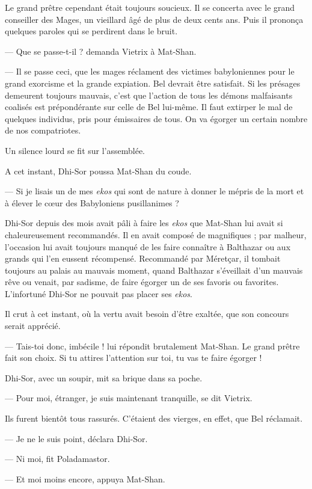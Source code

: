 \documentclass[a4paper, 11pt, oneside, polutonikogreek, french]{article}
\begin{document}
Le grand prêtre cependant était toujours soucieux. Il se concerta avec le grand conseiller des Mages, un vieillard âgé de plus de deux cents ans. Puis il prononça quelques paroles qui se perdirent dans le bruit.

--- Que se passe-t-il ? demanda Vietrix à Mat-Shan.

--- Il se passe ceci, que les mages réclament des victimes babyloniennes pour le grand exorcisme et la grande expiation. Bel devrait être satisfait. Si les présages demeurent toujours mauvais, c'est que l'action de tous les démons malfaisants coalisés est prépondérante sur celle de Bel lui-même. Il faut extirper le mal de quelques individus, pris pour émissaires de tous. On va égorger un certain nombre de nos compatriotes.

Un silence lourd se fit sur l'assemblée.

A cet instant, Dhi-Sor poussa Mat-Shan du coude.

--- Si je lisais un de mes \emph{ekos} qui sont de nature à donner le mépris de la mort et à élever le cœur des Babyloniens pusillanimes ?

Dhi-Sor depuis des mois avait pâli à faire les \emph{ekos} que Mat-Shan lui avait si chaleureusement recommandés. Il en avait composé de magnifiques ; par malheur, l'occasion lui avait toujours manqué de les faire connaître à Balthazar ou aux grands qui l'en eussent récompensé. Recommandé par Méretçar, il tombait toujours au palais au mauvais moment, quand Balthazar s'éveillait d'un mauvais rêve ou venait, par sadisme, de faire égorger un de ses favoris ou favorites. L'infortuné Dhi-Sor ne pouvait pas placer ses \emph{ekos}.

Il crut à cet instant, où la vertu avait besoin d'être exaltée, que son concours serait apprécié.

--- Tais-toi donc, imbécile ! lui répondit brutalement Mat-Shan. Le grand prêtre fait son choix. Si tu attires l'attention sur toi, tu vas te faire égorger !

Dhi-Sor, avec un soupir, mit sa brique dans sa poche.

--- Pour moi, étranger, je suis maintenant tranquille, se dit Vietrix.

Ils furent bientôt tous rassurés. C'étaient des vierges, en effet, que Bel réclamait.

--- Je ne le suis point, déclara Dhi-Sor.

--- Ni moi, fit Poladamastor.

--- Et moi moins encore, appuya Mat-Shan.
\end{document}
